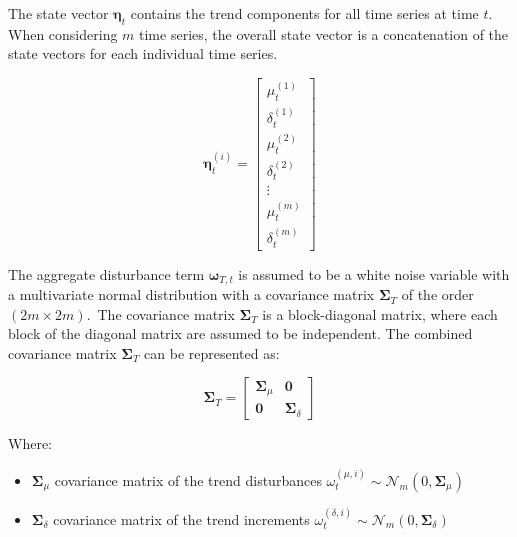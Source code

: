     The state vector $\bm{\eta}_{t}$ contains the trend components for all time series at time $t$.
    When considering $m$ time series, the overall state vector is a concatenation of the state vectors for each
    individual time series.

    \begin{equation}
        \bm{\eta}_{t}^{(i)}=
            \left[
                \begin{array}{c}
                    \mu_{t}^{(1)} \\
                    \delta_{t}^{(1)} \\
                    \mu_{t}^{(2)} \\
                    \delta_{t}^{(2)} \\
                    \vdots \\
                    \mu_{t}^{(m)} \\
                    \delta_{t}^{(m)}
                \end{array}
            \right]
        \label{eq:trend_state_vector}
    \end{equation}

    The aggregate disturbance term $\bm{\omega}_{T,t}$ is assumed to be a white noise variable with a multivariate normal distribution
    with a covariance matrix $\bm{\Sigma}_{T}$ of the order $(2m \times 2m)$.\ The covariance matrix $\bm{\Sigma}_{T}$
    is a block-diagonal matrix, where each block of the diagonal matrix are assumed to be independent.
    The combined covariance matrix $\bm{\Sigma}_{T}$ can be represented as:

    \begin{equation}
        \bm{\Sigma}_{T} =
            \left[
                \begin{array}{cc}
                    \mathbf{\Sigma}_{\mu} & \mathbf{0} \\
                    \mathbf{0}            & \mathbf{\Sigma}_{\delta}
                \end{array}
            \right]
        \label{eq:trend_covariance}
    \end{equation}

    Where:
    \begin{itemize}
        \item $\mathbf{\Sigma}_{\mu}$ covariance matrix of the trend disturbances $\omega_{t}^{(\mu,i)} \sim \mathcal{N}_{m}(0, \bm{\Sigma}_{\mu})$
        \item $\mathbf{\Sigma}_{\delta}$ covariance matrix of the trend increments $\omega_{t}^{(\delta,i)} \sim \mathcal{N}_{m}(0, \bm{\Sigma}_{\delta})$
    \end{itemize}

